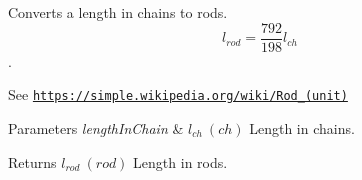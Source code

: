 Converts a length in chains to rods. \[ l_{rod}= \frac{792}{198} l_{ch} \]. 

See \href{https://simple.wikipedia.org/wiki/Rod_(unit)}{\tt https\+://simple.\+wikipedia.\+org/wiki/\+Rod\+\_\+(unit)} 
\begin{DoxyParams}{Parameters}
{\em length\+In\+Chain} & $ l_{ch}\ (ch)$ Length in chains. \\
\hline
\end{DoxyParams}
\begin{DoxyReturn}{Returns}
$ l_{rod}\ (rod)$ Length in rods. 
\end{DoxyReturn}
